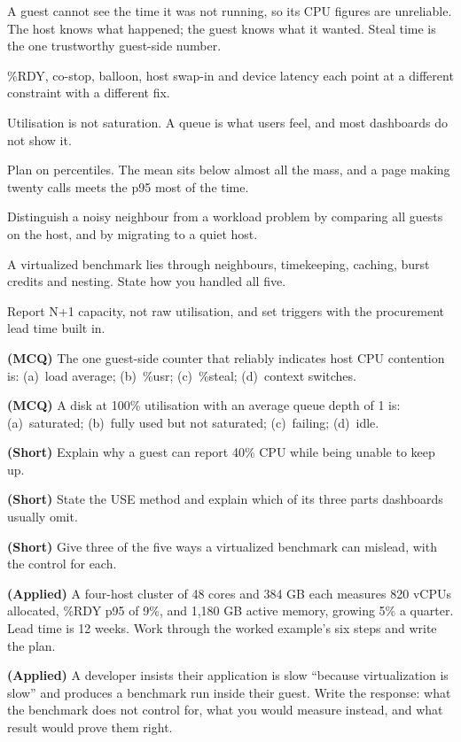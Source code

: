 \begin{chaptersummary}
\begin{tight}
  \item A guest cannot see the time it was not running, so its CPU figures are
        unreliable. The host knows what happened; the guest knows what it
        wanted. Steal time is the one trustworthy guest-side number.
  \item \%RDY, co-stop, balloon, host swap-in and device latency each point at
        a different constraint with a different fix.
  \item Utilisation is not saturation. A queue is what users feel, and most
        dashboards do not show it.
  \item Plan on percentiles. The mean sits below almost all the mass, and a
        page making twenty calls meets the p95 most of the time.
  \item Distinguish a noisy neighbour from a workload problem by comparing all
        guests on the host, and by migrating to a quiet host.
  \item A virtualized benchmark lies through neighbours, timekeeping, caching,
        burst credits and nesting. State how you handled all five.
  \item Report N+1 capacity, not raw utilisation, and set triggers with the
        procurement lead time built in.
\end{tight}
\end{chaptersummary}

\begin{reviewq}
  \item \textbf{(MCQ)} The one guest-side counter that reliably indicates host
        CPU contention is: (a)~load average; (b)~\%usr; (c)~\%steal;
        (d)~context switches.
  \item \textbf{(MCQ)} A disk at 100\% utilisation with an average queue depth
        of 1 is: (a)~saturated; (b)~fully used but not saturated;
        (c)~failing; (d)~idle.
  \item \textbf{(Short)} Explain why a guest can report 40\% CPU while being
        unable to keep up.
  \item \textbf{(Short)} State the USE method and explain which of its three
        parts dashboards usually omit.
  \item \textbf{(Short)} Give three of the five ways a virtualized benchmark
        can mislead, with the control for each.
  \item \textbf{(Applied)} A four-host cluster of 48 cores and 384 GB each
        measures 820 vCPUs allocated, \%RDY p95 of 9\%, and 1{,}180 GB active
        memory, growing 5\% a quarter. Lead time is 12 weeks. Work through the
        worked example's six steps and write the plan.
  \item \textbf{(Applied)} A developer insists their application is slow
        ``because virtualization is slow'' and produces a benchmark run inside
        their guest. Write the response: what the benchmark does not control
        for, what you would measure instead, and what result would prove them
        right.
\end{reviewq}
